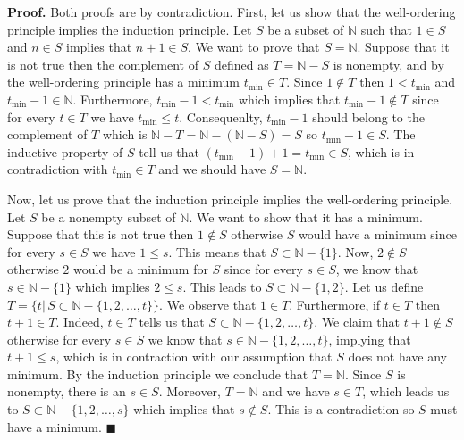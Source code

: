 \documentclass[10pt]{article}
\theoremstyle{definition}
\theoremstyle{remark}
\newenvironment{prf}{\noindent\textbf{Proof.}}{\hfill$\blacksquare$}
\begin{document}
\begin{prf}
Both proofs are by contradiction. First, let us show that the well-ordering principle implies the induction principle. Let $S$ be a subset of $\mathbb{N}$ such that $1 \in S$ and $n \in S$ implies that $n + 1 \in S$. We want to prove that $S = \mathbb{N}$. Suppose that it is not true then the complement of $S$ defined as $T = \mathbb{N} - S$ is nonempty, and by the well-ordering principle has a minimum $t_{\min} \in T$. Since $1 \notin T$ then $1 < t_{\min}$ and $t_{\min} - 1 \in \mathbb{N}$. Furthermore, $t_{\min} -1 < t_{\min}$ which implies that $t_{\min} - 1 \notin T$ since for every $t \in T$ we have $t_{\min} \leq t$.  Consequenlty, $t_{\min} - 1$ should belong to the complement of $T$ which is $\mathbb{N} - T = \mathbb{N} - (\mathbb{N} - S) = S$ so $t_{\min} - 1 \in S$. The inductive property of $S$ tell us that $(t_{\min} - 1) + 1 = t_{\min} \in S$, which is in contradiction with $t_{\min} \in T$ and we should have $S=\mathbb{N}$.

Now, let us prove that the induction principle implies the well-ordering principle. Let $S$ be a nonempty subset of $\mathbb{N}$. We want to show that it has a minimum. Suppose that this is not true then $1 \notin S$ otherwise $S$ would have a minimum since for every $s \in S$ we have $1 \leq s$. This means that $S \subset \mathbb{N} - \{ 1 \}$. Now, $2 \notin S$ otherwise $2$ would be a minimum for $S$ since for every $s \in S$, we know that $s \in \mathbb{N} - \{ 1 \}$ which implies $2 \leq s$. This leads to $S \subset \mathbb{N} - \{1, 2\}$. Let us define $T = \{ t | \, S \subset \mathbb{N} - \{ 1, 2, \dots, t\}  \}$. We observe that $1 \in T$. Furthermore, if $t \in T$ then $t + 1 \in T$. Indeed, $t \in T$ tells us that $S \subset \mathbb{N} - \{ 1, 2, \dots, t\}$. We claim that $t + 1 \notin S$ otherwise for every $s \in S$ we know that $s \in \mathbb{N} - \{1, 2, \dots, t\}$, implying that $t + 1 \leq s$, which is in contraction with our assumption that $S$ does not have any minimum. By the induction principle we conclude that $T = \mathbb{N}$. Since $S$ is nonempty, there is an $s \in S$. Moreover, $T = \mathbb{N}$ and we have $s \in T$, which leads us to $S \subset \mathbb{N} - \{1, 2, \dots, s \}$ which implies that $s \notin S$. This is a contradiction so $S$ must have a minimum.
\end{prf}
\end{document}
